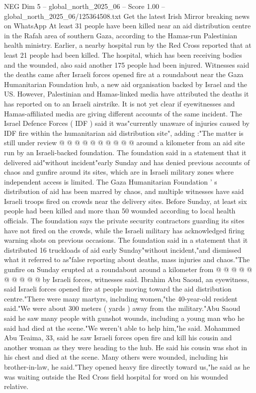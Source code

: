 \begin{textsample}{NEG Dim 5 – global\_north\_2025\_06 – Score 1.00 – global\_north\_2025\_06/125364508.txt}  \label{ex:f5_neg_382}
Get the latest Irish Mirror breaking news on WhatsApp At least 31 people have been killed near an aid distribution centre in the Rafah area of southern Gaza, according to the Hamas-run Palestinian health ministry.
Earlier, a nearby hospital run by the Red Cross reported that at least 21 people had been killed.
The hospital, which has been receiving bodies and the wounded, also said another 175 people had been injured.
Witnesses said the deaths came after Israeli forces opened fire at a roundabout near the Gaza Humanitarian Foundation hub, a new aid organisation backed by Israel and the US.
However, Palestinian and Hamas-linked media have attributed the deaths it has reported on to an Israeli airstrike.
It is not yet clear if eyewitnesses and Hamas-affiliated media are giving different accounts of the same incident.
The Israel Defence Forces ( IDF ) said it was"currently unaware of injuries caused by IDF fire within the humanitarian aid distribution site", adding :"The matter is still under review @ @ @ @ @ @ @ @ @ @ around a kilometer from an aid site run by an Israeli-backed foundation.
The foundation said in a statement that it delivered aid"without incident"early Sunday and has denied previous accounts of chaos and gunfire around its sites, which are in Israeli military zones where independent access is limited.
The Gaza Humanitarian Foundation ' s distribution of aid has been marred by chaos, and multiple witnesses have said Israeli troops fired on crowds near the delivery sites.
Before Sunday, at least six people had been killed and more than 50 wounded according to local health officials.
The foundation says the private security contractors guarding its sites have not fired on the crowds, while the Israeli military has acknowledged firing warning shots on previous occasions.
The foundation said in a statement that it distributed 16 truckloads of aid early Sunday"without incident,"and dismissed what it referred to as"false reporting about deaths, mass injuries and chaos."The gunfire on Sunday erupted at a roundabout around a kilometer from @ @ @ @ @ @ @ @ @ @ by Israeli forces, witnesses said.
Ibrahim Abu Saoud, an eyewitness, said Israeli forces opened fire at people moving toward the aid distribution centre."There were many martyrs, including women,"the 40-year-old resident said."We were about 300 meters ( yards ) away from the military."Abu Saoud said he saw many people with gunshot wounds, including a young man who he said had died at the scene."We weren't able to help him,"he said.
Mohammed Abu Teaima, 33, said he saw Israeli forces open fire and kill his cousin and another woman as they were heading to the hub.
He said his cousin was shot in his chest and died at the scene.
Many others were wounded, including his brother-in-law, he said."They opened heavy fire directly toward us,"he said as he was waiting outside the Red Cross field hospital for word on his wounded relative.

\end{textsample}

